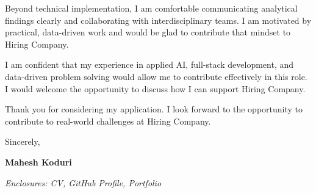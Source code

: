 \documentclass[11pt,a4paper]{letter}
\begin{document}
Beyond technical implementation, I am comfortable communicating analytical findings clearly and collaborating with interdisciplinary teams. I am motivated by practical, data-driven work and would be glad to contribute that mindset to Hiring Company.

I am confident that my experience in applied AI, full-stack development, and data-driven problem solving would allow me to contribute effectively in this role. I would welcome the opportunity to discuss how I can support Hiring Company.

Thank you for considering my application. I look forward to the opportunity to contribute to real-world challenges at Hiring Company.

\vspace{0.5cm}

Sincerely,

\vspace{0.8cm}

\textbf{ Mahesh Koduri }

\vspace{0.5cm}

\textit{Enclosures: CV, GitHub Profile, Portfolio}
\end{document}
